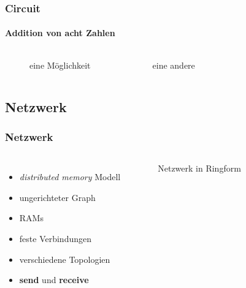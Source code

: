 \begin{frame}[b]
    \frametitle{Circuit}
    \framesubtitle{Addition von acht Zahlen}
    \begin{columns}[b]
        \begin{figure}
            \centering
            
            \caption{eine Möglichkeit}
        \end{figure}
        \pause
        \begin{figure}
            \centering
            
            \caption{eine andere}
        \end{figure}
    \end{columns}
\end{frame}

\subsection{Netzwerk}
\begin{frame}
    \frametitle{Netzwerk}
    \begin{columns}
        \begin{itemize}
            \item \emph{distributed memory} Modell
            \item ungerichteter Graph
            \item RAMs
            \item feste Verbindungen
            \item verschiedene Topologien
            \item \textbf{send} und \textbf{receive}
        \end{itemize}
        \begin{figure}
            \centering
            
            \caption{Netzwerk in Ringform}
        \end{figure}
    \end{columns}
\end{frame}

